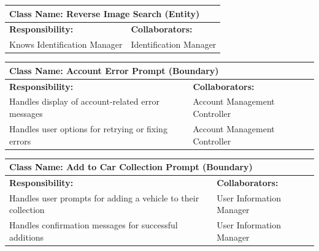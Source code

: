 \documentclass[]{article}
\begin{document}
\begin{table}[ht]
    \centering
    \begin{tabular}{|p{7cm}|p{7cm}|}
        \hline
        \multicolumn{2}{|l|}{\textbf{Class Name: Reverse Image Search (Entity)}} \\
        \hline
        \textbf{Responsibility:} & \textbf{Collaborators:} \\
        \hline
        Knows Identification Manager & Identification Manager \\
        \hline
    \end{tabular}
\end{table}
 
\begin{table}[ht]
    \centering
    \begin{tabular}{|p{7cm}|p{7cm}|}
        \hline
        \multicolumn{2}{|l|}{\textbf{Class Name: Account Error Prompt (Boundary)}} \\
        \hline
        \textbf{Responsibility:} & \textbf{Collaborators:} \\
        \hline
        Handles display of account-related error messages & Account Management Controller \\
        Handles user options for retrying or fixing errors & Account Management Controller \\
        \hline
    \end{tabular}
\end{table}
 
\begin{table}[ht]
    \centering
    \begin{tabular}{|p{7cm}|p{7cm}|}
        \hline
        \multicolumn{2}{|l|}{\textbf{Class Name: Add to Car Collection Prompt (Boundary)}} \\
        \hline
        \textbf{Responsibility:} & \textbf{Collaborators:} \\
        \hline
        Handles user prompts for adding a vehicle to their collection & User Information Manager \\
        Handles confirmation messages for successful additions & User Information Manager \\
        \hline
    \end{tabular}
\end{table}
 
\end{document}
